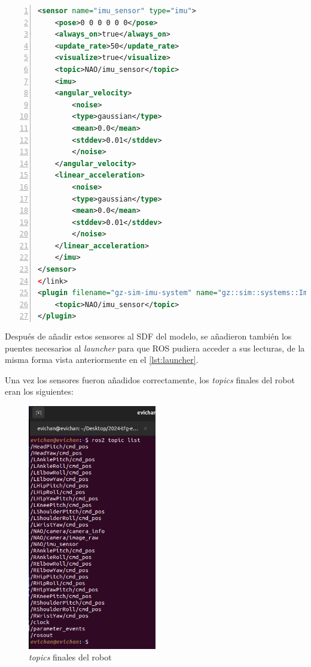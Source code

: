 \begin{lstlisting}[language=XML, caption={Adicición del sensor IMU al modelo}, label={lst:imu_modelo}, numbers=left, backgroundcolor=\color{gray!10}]    
<sensor name="imu_sensor" type="imu">
    <pose>0 0 0 0 0 0</pose>
    <always_on>true</always_on>
    <update_rate>50</update_rate>
    <visualize>true</visualize>
    <topic>NAO/imu_sensor</topic>
    <imu>
    <angular_velocity>
        <noise>
        <type>gaussian</type>
        <mean>0.0</mean>
        <stddev>0.01</stddev>
        </noise>
    </angular_velocity>
    <linear_acceleration>
        <noise>
        <type>gaussian</type>
        <mean>0.0</mean>
        <stddev>0.01</stddev>
        </noise>
    </linear_acceleration>
    </imu>
</sensor>       
</link>
<plugin filename="gz-sim-imu-system" name="gz::sim::systems::Imu">
    <topic>NAO/imu_sensor</topic>
</plugin> 
\end{lstlisting}

Después de añadir estos sensores al SDF del modelo, se añadieron también los puentes necesarios al \textit{launcher} para que ROS pudiera acceder a sus lecturas, de la misma forma vista anteriormente en el \autoref{lst:launcher}.

Una vez los sensores fueron añadidos correctamente, los \textit{topics} finales del robot eran los siguientes:

\begin{figure}[H]
  \centering
  \includegraphics[width=0.5\textwidth]{figures/cap_4/topics_completos.png}
  \caption{\textit{topics} finales del robot}
  \label{fig:topics_completos}
\end{figure}


